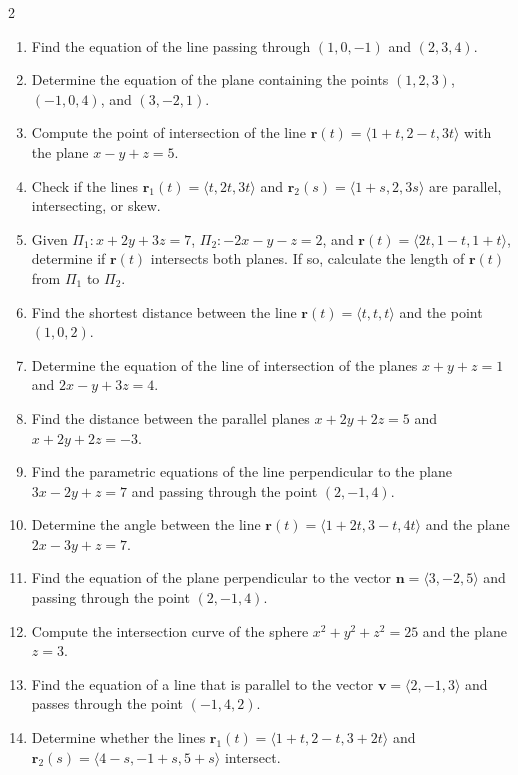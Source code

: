 \begin{multicols}{2}
\begin{enumerate}
    \item Find the equation of the line passing through \( (1, 0, -1) \) and \( (2, 3, 4) \).
    \item Determine the equation of the plane containing the points \( (1, 2, 3) \), \( (-1, 0, 4) \), and \( (3, -2, 1) \).
    \item Compute the point of intersection of the line \( \mathbf{r}(t) = \langle 1 + t, 2 - t, 3t \rangle \) with the plane \( x - y + z = 5 \).
    \item Check if the lines \( \mathbf{r}_1(t) = \langle t, 2t, 3t \rangle \) and \( \mathbf{r}_2(s) = \langle 1 + s, 2, 3s \rangle \) are parallel, intersecting, or skew.
    \item Given \( \Pi_1: x + 2y + 3z = 7 \), \( \Pi_2: -2x - y - z = 2 \), and \( \mathbf{r}(t) = \langle 2t, 1 - t, 1 + t \rangle \), determine if \( \mathbf{r}(t) \) intersects both planes. If so, calculate the length of \( \mathbf{r}(t) \) from \( \Pi_1 \) to \( \Pi_2 \).
    \item Find the shortest distance between the line \( \mathbf{r}(t) = \langle t, t, t \rangle \) and the point \( (1, 0, 2) \).
    \item Determine the equation of the line of intersection of the planes \( x + y + z = 1 \) and \( 2x - y + 3z = 4 \).
    \item Find the distance between the parallel planes \( x + 2y + 2z = 5 \) and \( x + 2y + 2z = -3 \).
    \item Find the parametric equations of the line perpendicular to the plane \( 3x - 2y + z = 7 \) and passing through the point \( (2, -1, 4) \).
    \item Determine the angle between the line \( \mathbf{r}(t) = \langle 1 + 2t, 3 - t, 4t \rangle \) and the plane \( 2x - 3y + z = 7 \).
    \item Find the equation of the plane perpendicular to the vector \( \mathbf{n} = \langle 3, -2, 5 \rangle \) and passing through the point \( (2, -1, 4) \).
    \item Compute the intersection curve of the sphere \( x^2 + y^2 + z^2 = 25 \) and the plane \( z = 3 \).
    \item Find the equation of a line that is parallel to the vector \( \mathbf{v} = \langle 2, -1, 3 \rangle \) and passes through the point \( (-1, 4, 2) \).
    \item Determine whether the lines \( \mathbf{r}_1(t) = \langle 1 + t, 2 - t, 3 + 2t \rangle \) and \( \mathbf{r}_2(s) = \langle 4 - s, -1 + s, 5 + s \rangle \) intersect.

\end{enumerate}
\end{multicols}
